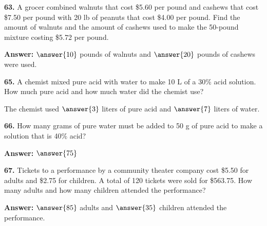 \documentclass{ximera}
\begin{document}
\begin{problem}
\textbf{63.} A grocer combined walnuts that cost \$5.60 per pound and cashews that cost \$7.50
  per pound with 20 lb of peanuts that cost \$4.00 per pound. Find the amount of walnuts
  and the amount of cashews used to make the 50-pound mixture costing \$5.72 per pound.

\textbf{Answer:} $\answer{10}$ pounds of walnuts and $\answer{20}$ pounds of cashews were used.
\end{problem}

\begin{problem}
\textbf{65.} A chemist mixed pure acid with water to make 10 L of a 30\% acid solution. How
  much pure acid and how much water did the chemist use?

The chemist used $\answer{3}$ liters of pure acid and $\answer{7}$ liters of water.
\end{problem}

\begin{problem}
\textbf{66.} How many grams of pure water must be added to 50 g of pure acid to make a solution
  that is 40\% acid?

\textbf{Answer:} $\answer{75}$
\end{problem}

\begin{problem}
\textbf{67.} Tickets to a performance by a community theater company cost \$5.50 for adults and
  \$2.75 for children. A total of 120 tickets were sold for \$563.75. How many adults and
  how many children attended the performance?

\textbf{Answer:} $\answer{85}$ adults and $\answer{35}$ children attended the performance.
\end{problem}
\end{document}
